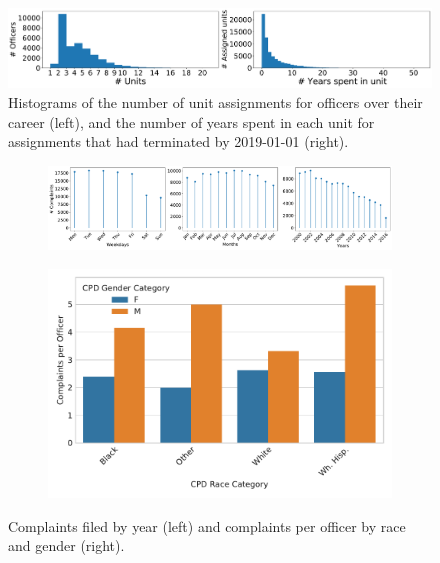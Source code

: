\begin{figure}[t!] 
	\includegraphics[width=\textwidth]{figs/units_officers.pdf} 
	\caption{Histograms of the number of unit assignments for
officers over their career (left), and the number of years spent in each unit for assignments that had terminated by 2019-01-01 (right).}
\label{fig:units}
\end{figure}

\begin{figure}[t!] 
\begin{subfigure}{0.44\textwidth}
	\includegraphics[width=\textwidth, clip, trim= 970 0 0 0]{figs/complaints_times} 
\end{subfigure}
\begin{subfigure}{0.52\textwidth}
	\includegraphics[width=\textwidth]{figs/complaints} 
\end{subfigure}
	\caption{Complaints filed by year (left) and complaints per officer by race and gender (right).} \label{fig:complaints}
\end{figure}
